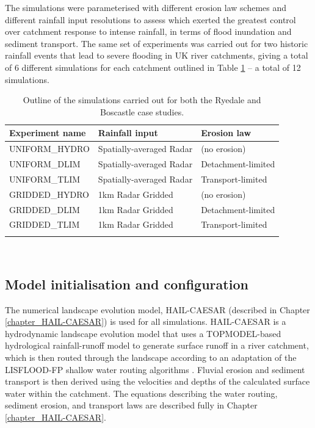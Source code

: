 The simulations were parameterised with different erosion law schemes and different rainfall input resolutions to assess which exerted the greatest control over catchment response to intense rainfall, in terms of flood inundation and sediment transport. The same set of experiments was carried out for two historic rainfall events that lead to severe flooding in UK river catchments, giving a total of 6 different simulations for each catchment outlined in Table \ref{table_ensemble_experiments} -- a total of 12 simulations.

\begin{table}
\begin{tabular}{lll}
\\
\textbf{Experiment name}   & \textbf{Rainfall input} & \textbf{Erosion law}  \\
\hline
UNIFORM\_HYDRO  &  Spatially-averaged  Radar  & (no erosion) \\
UNIFORM\_DLIM      &  Spatially-averaged  Radar & Detachment-limited \\
UNIFORM\_TLIM       &  Spatially-averaged  Radar & Transport-limited \\

GRIDDED\_HYDRO  &  1km Radar Gridded  & (no erosion) \\
GRIDDED\_DLIM      &  1km Radar Gridded  & Detachment-limited \\
GRIDDED\_TLIM       &  1km Radar Gridded   & Transport-limited \\
\hline \\ 
\end{tabular} 
\caption{Outline of the simulations carried out for both the Ryedale and Boscastle case studies.}
\label{table_ensemble_experiments}
\end{table}

\

\subsection{Model initialisation and configuration}
The numerical landscape evolution model, HAIL-CAESAR (described in Chapter \ref{chapter_HAIL-CAESAR}) is used for all simulations. HAIL-CAESAR is a hydrodynamic landscape evolution model that uses a TOPMODEL-based hydrological rainfall-runoff model to generate surface runoff in a river catchment, which is then routed through the landscape according to an adaptation of the LISFLOOD-FP shallow water routing algorithms \citep{bates2010simple}. Fluvial erosion and sediment transport is then derived using the velocities and depths of the calculated surface water within the catchment. The equations describing the water routing, sediment erosion, and transport laws are described fully in Chapter \ref{chapter_HAIL-CAESAR}.

